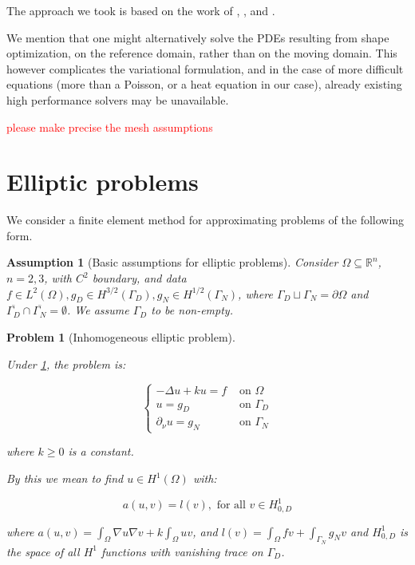 \documentclass[english,a4paper,9pt,oneside]{scrbook}	%
\theoremstyle{break}
\newtheorem{ass}[equation]{Assumption}
\newtheorem{pb}[equation]{Problem}
\theoremstyle{remark}
\newcommand{\mR}{\mathbb{R}}
\newcommand{\ds}{\displaystyle}
\begin{document}
\begin{appendices}
The approach we took is based on the work of \cite{elliott}, \cite{ranner}, \cite{bernardi} and \cite{edelmann}.

We mention that one might alternatively solve the PDEs resulting from shape optimization, on the reference domain, rather than on the moving domain. This however complicates the variational formulation, and in the case of more difficult equations (more than a Poisson, or a heat equation in our case), already existing high performance solvers may be unavailable.

\textcolor{red}{	please make precise the mesh assumptions}

\section{Elliptic problems}

We consider a finite element method for approximating problems of the following form.

\begin{ass}[Basic assumptions for elliptic problems]
\label{ass:inh_ell}
Consider $\Omega \subseteq \mR^n$, $n=2,3$, with $C^2$ boundary, and data $f \in L^2(\Omega), g_D \in H^{3/2}(\Gamma_D), g_N \in H^{1/2}(\Gamma_N)$, where $\Gamma_D \sqcup \Gamma_N = \partial \Omega$ and $\overline{\Gamma_D}\cap \overline{\Gamma_N}=\emptyset$. We assume $\Gamma_D$ to be non-empty.

\end{ass}

\begin{pb}[Inhomogeneous elliptic problem]
\label{pb:inh_elliptic}

Under \cref{ass:inh_ell}, the problem is:

$$
\left\{\begin{matrix}
-\Delta u + k u = f & \text{ on } \Omega \\ 
u = g_D & \text{ on } \Gamma_D \\ 
\partial_\nu u = g_N & \text{ on } \Gamma_N 
\end{matrix}\right.
$$

where $k \geq 0$ is a constant.

By this we mean to find $u \in H^1(\Omega)$ with:

$$a(u,v) = l(v), \text{ for all } v \in H^1_{0,D}$$

where $a(u,v) =\ds \int_{\Omega}\nabla u \nabla v + k \int_{\Omega} u  v$, and $l(v) = \ds\int_{\Omega}f v + \int_{\Gamma_N} g_{N}v$ and $H^1_{0,D}$ is the space of all $H^1$ functions with vanishing trace on $\Gamma_D$.


\end{pb}
\end{appendices}
\end{document}
